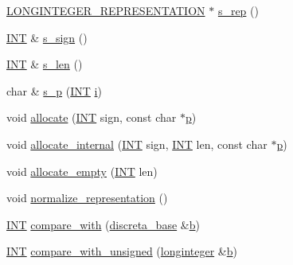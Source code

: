 \begin{DoxyCompactItemize}
\item 
\mbox{\hyperlink{discreta_8h_acfd8c2baf438bb4e79d8e8d4b0ca2b8e}{L\+O\+N\+G\+I\+N\+T\+E\+G\+E\+R\+\_\+\+R\+E\+P\+R\+E\+S\+E\+N\+T\+A\+T\+I\+ON}} $\ast$ \mbox{\hyperlink{classlonginteger_ad1ec809a79c42ffe63d6c9e6dd46bff5}{s\+\_\+rep}} ()
\item 
\mbox{\hyperlink{galois_8h_a09fddde158a3a20bd2dcadb609de11dc}{I\+NT}} \& \mbox{\hyperlink{classlonginteger_a33f5b6c545e97635cb71670f76ed1fb3}{s\+\_\+sign}} ()
\item 
\mbox{\hyperlink{galois_8h_a09fddde158a3a20bd2dcadb609de11dc}{I\+NT}} \& \mbox{\hyperlink{classlonginteger_a5d414ae211f4e16abd932257351c74df}{s\+\_\+len}} ()
\item 
char \& \mbox{\hyperlink{classlonginteger_aa946d4c3bfd34bbfd0b811d5f5795f82}{s\+\_\+p}} (\mbox{\hyperlink{galois_8h_a09fddde158a3a20bd2dcadb609de11dc}{I\+NT}} \mbox{\hyperlink{alphabet2_8_c_acb559820d9ca11295b4500f179ef6392}{i}})
\item 
void \mbox{\hyperlink{classlonginteger_a6d5f2429a98a2fea96aa605d1a6b1e6e}{allocate}} (\mbox{\hyperlink{galois_8h_a09fddde158a3a20bd2dcadb609de11dc}{I\+NT}} sign, const char $\ast$\mbox{\hyperlink{alphabet2_8_c_a533391314665d6bf1b5575e9a9cd8552}{p}})
\item 
void \mbox{\hyperlink{classlonginteger_af2df35d345485e9cd3c3088a80ec232d}{allocate\+\_\+internal}} (\mbox{\hyperlink{galois_8h_a09fddde158a3a20bd2dcadb609de11dc}{I\+NT}} sign, \mbox{\hyperlink{galois_8h_a09fddde158a3a20bd2dcadb609de11dc}{I\+NT}} len, const char $\ast$\mbox{\hyperlink{alphabet2_8_c_a533391314665d6bf1b5575e9a9cd8552}{p}})
\item 
void \mbox{\hyperlink{classlonginteger_a40b25b8aed02337972489655293eda99}{allocate\+\_\+empty}} (\mbox{\hyperlink{galois_8h_a09fddde158a3a20bd2dcadb609de11dc}{I\+NT}} len)
\item 
void \mbox{\hyperlink{classlonginteger_a5e03d4e260c963943ba123114314c88b}{normalize\+\_\+representation}} ()
\item 
\mbox{\hyperlink{galois_8h_a09fddde158a3a20bd2dcadb609de11dc}{I\+NT}} \mbox{\hyperlink{classlonginteger_aaa504bac9b133d50b5ac50768f97db9d}{compare\+\_\+with}} (\mbox{\hyperlink{classdiscreta__base}{discreta\+\_\+base}} \&\mbox{\hyperlink{alphabet2_8_c_a148e3876077787926724625411d6e7a9}{b}})
\item 
\mbox{\hyperlink{galois_8h_a09fddde158a3a20bd2dcadb609de11dc}{I\+NT}} \mbox{\hyperlink{classlonginteger_ab08011cadec55cf084dbffcb74bb4991}{compare\+\_\+with\+\_\+unsigned}} (\mbox{\hyperlink{classlonginteger}{longinteger}} \&\mbox{\hyperlink{alphabet2_8_c_a148e3876077787926724625411d6e7a9}{b}})

\end{DoxyCompactItemize}
